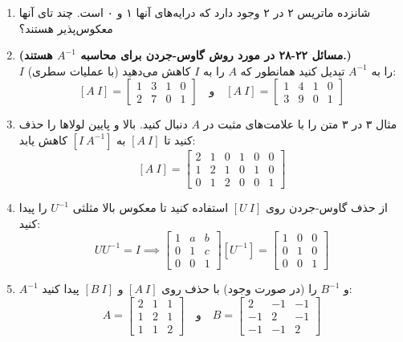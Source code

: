 \documentclass[12pt, a4paper]{book}
\begin{document}
\begin{enumerate}
		\item شانزده ماتریس ۲ در ۲ وجود دارد که درایه‌های آنها ۱ و ۰ است. چند تای آنها معکوس‌پذیر هستند؟
		
		\item \textbf{(مسائل ۲۲-۲۸ در مورد روش گاوس-جردن برای محاسبه $A^{-1}$ هستند.)}\\
		$I$ را به $A^{-1}$ تبدیل کنید همانطور که $A$ را به $I$ کاهش می‌دهید (با عملیات سطری):
		\[ [A \ I] = \left[ \begin{array}{cc|cc} 1 & 3 & 1 & 0 \\ 2 & 7 & 0 & 1 \end{array} \right] \quad \text{و} \quad [A \ I] = \left[ \begin{array}{cc|cc} 1 & 4 & 1 & 0 \\ 3 & 9 & 0 & 1 \end{array} \right] \]
		
		\item مثال ۳ در ۳ متن را با علامت‌های مثبت در $A$ دنبال کنید. بالا و پایین لولاها را حذف کنید تا $[A \ I]$ به $[I \ A^{-1}]$ کاهش یابد:
		\[ [A \ I] = \left[ \begin{array}{ccc|ccc} 2 & 1 & 0 & 1 & 0 & 0 \\ 1 & 2 & 1 & 0 & 1 & 0 \\ 0 & 1 & 2 & 0 & 0 & 1 \end{array} \right] \]
		
		\item از حذف گاوس-جردن روی $[U \ I]$ استفاده کنید تا معکوس بالا مثلثی $U^{-1}$ را پیدا کنید:
		\[ UU^{-1}=I \implies \begin{bmatrix} 1 & a & b \\ 0 & 1 & c \\ 0 & 0 & 1 \end{bmatrix} [U^{-1}] = \begin{bmatrix} 1 & 0 & 0 \\ 0 & 1 & 0 \\ 0 & 0 & 1 \end{bmatrix} \]
		
		\item $A^{-1}$ و $B^{-1}$ را (در صورت وجود) با حذف روی $[A \ I]$ و $[B \ I]$ پیدا کنید:
		\[ A = \begin{bmatrix} 2 & 1 & 1 \\ 1 & 2 & 1 \\ 1 & 1 & 2 \end{bmatrix} \quad \text{و} \quad B = \begin{bmatrix} 2 & -1 & -1 \\ -1 & 2 & -1 \\ -1 & -1 & 2 \end{bmatrix} \]
		

\end{enumerate}
\end{document}
